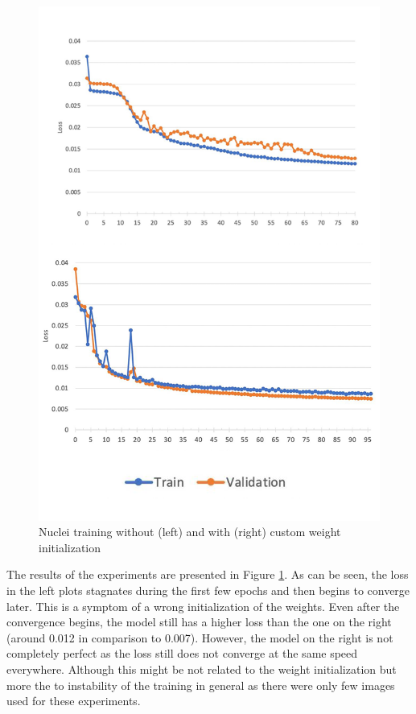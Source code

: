 \begin{figure}[H]
	\begin{center}
		\includegraphics[width=0.8\linewidth]{bilder/nuclei/wi-no-wi.png}
		\caption{Nuclei training without (left) and with (right) custom weight initialization}\label{fig:wi}
	\end{center}
\end{figure}

The results of the experiments are presented in Figure \ref{fig:wi}. As can be seen, the loss in the left plots stagnates during the first few epochs and then begins to converge later. This is a symptom of a wrong initialization of the weights. Even after the convergence begins, the model still has a higher loss than the one on the right (around 0.012 in comparison to 0.007). However, the model on the right is not completely perfect as the loss still does not converge at the same speed everywhere. Although this might be not related to the weight initialization but more the to instability of the training in general as there were only few images used for these experiments.
